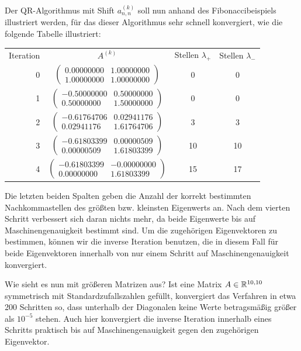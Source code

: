 Der QR-Algorithmus mit Shift $a^{(k)}_{n,n}$ soll nun anhand des
Fibonaccibeispiels illustriert werden, für das dieser Algorithmus sehr
schnell konvergiert, wie die folgende Tabelle illustriert:
\begin{center}
  \renewcommand{\arraystretch}{1.3}
  \begin{tabular}{r|c|c|c}
    Iteration & $A^{(k)}$ & Stellen $\lambda_+$ &  Stellen $\lambda_-$\\
    0 & $\begin{pmatrix}
      0.00000000 &  1.00000000\\
      1.00000000 &  1.00000000
    \end{pmatrix}$
    & 0 & 0\\
    1 & $\begin{pmatrix}
      -0.50000000 &  0.50000000\\
      0.50000000 & 1.50000000
    \end{pmatrix}$
    & 0 & 0\\
    2 & $\begin{pmatrix}
      -0.61764706 &  0.02941176\\
      0.02941176 & 1.61764706
    \end{pmatrix}$
    & 3 & 3\\
    3 & $\begin{pmatrix}
      -0.61803399 &  0.00000509\\
      0.00000509 & 1.61803399
    \end{pmatrix}$
    & 10 & 10\\
    4 & $\begin{pmatrix}
      -0.61803399 & -0.00000000\\
      0.00000000 & 1.61803399
    \end{pmatrix}$ & 15 & 17
  \end{tabular}
\end{center}
Die letzten beiden Spalten geben die Anzahl der korrekt bestimmten
Nachkommastellen des größten bzw. kleinsten Eigenwerts an. Nach dem
vierten Schritt verbessert sich daran nichts mehr, da beide Eigenwerte
bis auf Maschinengenauigkeit bestimmt sind.  Um die zugehörigen
Eigenvektoren zu bestimmen, können wir die inverse Iteration benutzen,
die in diesem Fall für beide Eigenvektoren innerhalb von nur einem
Schritt auf Maschinengenauigkeit konvergiert.

Wie sieht es nun mit größeren Matrizen aus? Ist eine Matrix
$A\in\mathbb{R}^{10,10}$ symmetrisch mit Standardzufallszahlen gefüllt,
konvergiert das Verfahren in etwa 200 Schritten so, dass unterhalb der
Diagonalen keine Werte betragsmäßig größer als $10^{-5}$ stehen. Auch
hier konvergiert die inverse Iteration innerhalb eines Schritts
praktisch bis auf Maschinengenauigkeit gegen den zugehörigen
Eigenvektor.


